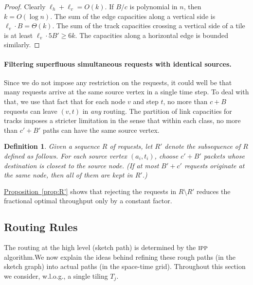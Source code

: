 \documentclass[11pt]{article}
\newtheorem{definition}[theorem]{Definition}
\newcommand{\namedref}[2]{\hyperref[#2]{#1~\ref*{#2}}}
\newcommand{\propref}[1]{\namedref{Proposition}{#1}}
\newcommand{\route}{\text{\sc{ipp}}\xspace}
\newcommand{\IPP}{\route}
\newenvironment{proof sketch}[1]{\noindent {\emph{Proof sketch of #1:}}}{\hfill \qed}
\newcommand{\Hl}{\ell_h}
\newcommand{\vl}{\ell_v}
\begin{document}
\begin{proof}
  Clearly $\Hl+\vl=O(k)$. If $B/c$ is polynomial in $n$, then
  $k=O(\log n)$.  The sum of the edge capacities along a vertical side
  is $\vl\cdot B = \Theta(k)$.  The sum of the track capacities
  crossing a vertical side of a tile is at least $\vl \cdot 5B' \geq
  6k$. The capacities along a horizontal edge is bounded similarly.
\end{proof}


\paragraph{Filtering superfluous simultaneous requests with identical sources\ifnum{}.\fi}
Since we do not impose any restriction on the requests, it could well be that many
requests arrive at the same source vertex in a single time step. To deal with that,
we use that fact that for each node $v$ and step $t$, no more than $c+B$ requests can
leave $(v,t)$ in \emph{any} routing. The partition of link capacities for tracks
imposes a stricter limitation in the sense that within each class, no more than
$c'+B'$ paths can have the same source vertex.
\begin{definition}\label{def:R'}
  Given a sequence $R$ of requests, let $R'$ denote the subsequence of $R$ defined as
  follows.  For each source vertex $(a_i,t_i)$, choose $c'+B'$
  packets whose destination is closest to the source node. (If at most $B'+c'$
  requests originate at the same node, then all of them are kept
  in $R'$.)
\end{definition}
\noindent
\propref{prop:R'} shows that rejecting the requests in $R\setminus R'$ reduces the
fractional optimal throughput only by a constant factor.
\subsection{Routing Rules}
The routing at the high level (sketch path) is determined by the
$\IPP$ algorithm.We now explain the
ideas behind refining these rough paths (in the sketch graph) into
actual paths (in the space-time grid). Throughout this section we
consider, w.l.o.g.,  a single tiling $T_j$.
\end{document}
